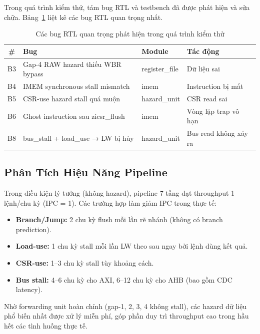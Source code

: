 Trong quá trình kiểm thử, tám bug RTL và testbench đã được phát hiện và sửa chữa. Bảng~\ref{tab:bugs} liệt kê các bug RTL quan trọng nhất.

\begin{table}[htbp]
\caption{Các bug RTL quan trọng phát hiện trong quá trình kiểm thử}
\label{tab:bugs}
\begin{center}
\begin{tabular}{|c|l|l|l|}
\hline
\textbf{\#} & \textbf{Bug} & \textbf{Module} & \textbf{Tác động} \\ \hline
B3 & Gap-4 RAW hazard thiếu WBR bypass & register\_file & Dữ liệu sai \\ \hline
B4 & IMEM synchronous stall mismatch & imem & Instruction bị mất \\ \hline
B5 & CSR-use hazard stall quá muộn & hazard\_unit & CSR read sai \\ \hline
B6 & Ghost instruction sau zicsr\_flush & imem & Vòng lặp trap vô hạn \\ \hline
B8 & bus\_stall + load\_use → LW bị hủy & hazard\_unit & Bus read không xảy ra \\ \hline
\end{tabular}
\end{center}
\end{table}

\subsection{Phân Tích Hiệu Năng Pipeline}

Trong điều kiện lý tưởng (không hazard), pipeline 7 tầng đạt throughput 1 lệnh/chu kỳ (IPC = 1). Các trường hợp làm giảm IPC trong thực tế:

\begin{itemize}
    \item \textbf{Branch/Jump:} 2 chu kỳ flush mỗi lần rẽ nhánh (không có branch prediction).
    \item \textbf{Load-use:} 1 chu kỳ stall mỗi lần LW theo sau ngay bởi lệnh dùng kết quả.
    \item \textbf{CSR-use:} 1--3 chu kỳ stall tùy khoảng cách.
    \item \textbf{Bus stall:} 4--6 chu kỳ cho AXI, 6--12 chu kỳ cho AHB (bao gồm CDC latency).
\end{itemize}

Nhờ forwarding unit hoàn chỉnh (gap-1, 2, 3, 4 không stall), các hazard dữ liệu phổ biến nhất được xử lý miễn phí, góp phần duy trì throughput cao trong hầu hết các tình huống thực tế.
